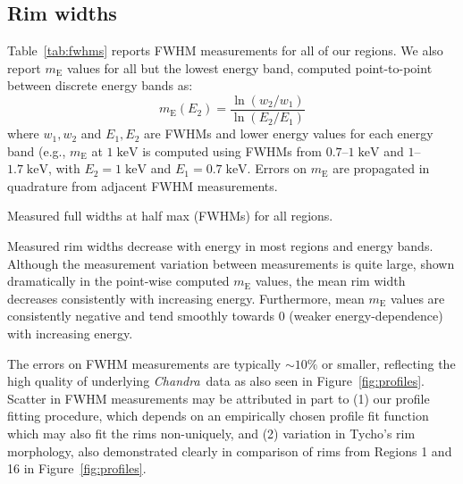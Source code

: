 \documentclass[iop, apj, numberedappendix, twocolappendix]{emulateapj}
\newcommand*{\mt}{\mathrm}
\newcommand*{\unit}[1]{\;\mt{#1}}  %
\newcommand*{\abt}{\mathord{\sim}} %
\newcommand*{\Chandra}{\textit{Chandra}\ }
\newcommand*{\mE}{m_\mt{E}}
\begin{document}
\subsection{Rim widths}
\label{sec:fwhm-results}

Table~\ref{tab:fwhms} reports FWHM measurements for all of our regions.
We also report $\mE$ values for all but the lowest energy band, computed
point-to-point between discrete energy bands as:
\begin{equation}
    \mE(E_2) = \frac{\ln(w_2/w_1)}{\ln(E_2/E_1)}
\end{equation}
where $w_1, w_2$ and $E_1, E_2$ are FWHMs and lower energy values for each
energy band (e.g., $\mE$ at $1 \unit{keV}$ is computed using FWHMs from
$0.7$--$1 \unit{keV}$ and $1$--$1.7 \unit{keV}$, with $E_2 = 1
\unit{keV}$ and $E_1 = 0.7 \unit{keV}$.  Errors on $\mE$ are propagated in
quadrature from adjacent FWHM measurements.

\begin{table*}[ht]
    \scriptsize
    \centering
    \caption{Measured full widths at half max (FWHMs) for all regions.
             \label{tab:fwhms}}
    
\end{table*}

Measured rim widths decrease with energy in most regions and energy bands.
Although the measurement variation between measurements is quite large, shown
dramatically in the point-wise computed $\mE$ values, the mean rim width
decreases consistently with increasing energy.  Furthermore, mean $\mE$ values
are consistently negative and tend smoothly towards $0$ (weaker
energy-dependence) with increasing energy.

The errors on FWHM measurements are typically $\abt 10\%$ or smaller,
reflecting the high quality of underlying \Chandra data as also seen in
Figure~\ref{fig:profiles}.  Scatter in FWHM measurements may be attributed in
part to (1) our profile fitting procedure, which depends on an empirically
chosen profile fit function which may also fit the rims non-uniquely, and (2)
variation in Tycho's rim morphology, also demonstrated clearly in
comparison of rims from Regions 1 and 16 in Figure~\ref{fig:profiles}.

\end{document}
